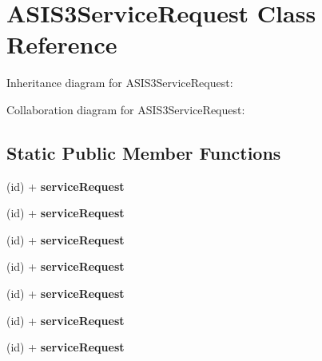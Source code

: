 \hypertarget{interface_a_s_i_s3_service_request}{
\section{\-A\-S\-I\-S3\-Service\-Request \-Class \-Reference}
\label{interface_a_s_i_s3_service_request}
}


\-Inheritance diagram for \-A\-S\-I\-S3\-Service\-Request\-:


\-Collaboration diagram for \-A\-S\-I\-S3\-Service\-Request\-:
\subsection*{\-Static \-Public \-Member \-Functions}
\begin{DoxyCompactItemize}
\item 
\hypertarget{interface_a_s_i_s3_service_request_ac7cd538c52b7aa2d7f08a082bbd6d747}{
(id) + {\bfseries service\-Request}}
\label{interface_a_s_i_s3_service_request_ac7cd538c52b7aa2d7f08a082bbd6d747}

\item 
\hypertarget{interface_a_s_i_s3_service_request_ac7cd538c52b7aa2d7f08a082bbd6d747}{
(id) + {\bfseries service\-Request}}
\label{interface_a_s_i_s3_service_request_ac7cd538c52b7aa2d7f08a082bbd6d747}

\item 
\hypertarget{interface_a_s_i_s3_service_request_ac7cd538c52b7aa2d7f08a082bbd6d747}{
(id) + {\bfseries service\-Request}}
\label{interface_a_s_i_s3_service_request_ac7cd538c52b7aa2d7f08a082bbd6d747}

\item 
\hypertarget{interface_a_s_i_s3_service_request_ac7cd538c52b7aa2d7f08a082bbd6d747}{
(id) + {\bfseries service\-Request}}
\label{interface_a_s_i_s3_service_request_ac7cd538c52b7aa2d7f08a082bbd6d747}

\item 
\hypertarget{interface_a_s_i_s3_service_request_ac7cd538c52b7aa2d7f08a082bbd6d747}{
(id) + {\bfseries service\-Request}}
\label{interface_a_s_i_s3_service_request_ac7cd538c52b7aa2d7f08a082bbd6d747}

\item 
\hypertarget{interface_a_s_i_s3_service_request_ac7cd538c52b7aa2d7f08a082bbd6d747}{
(id) + {\bfseries service\-Request}}
\label{interface_a_s_i_s3_service_request_ac7cd538c52b7aa2d7f08a082bbd6d747}

\item 
\hypertarget{interface_a_s_i_s3_service_request_ac7cd538c52b7aa2d7f08a082bbd6d747}{
(id) + {\bfseries service\-Request}}
\label{interface_a_s_i_s3_service_request_ac7cd538c52b7aa2d7f08a082bbd6d747}


\end{DoxyCompactItemize}
